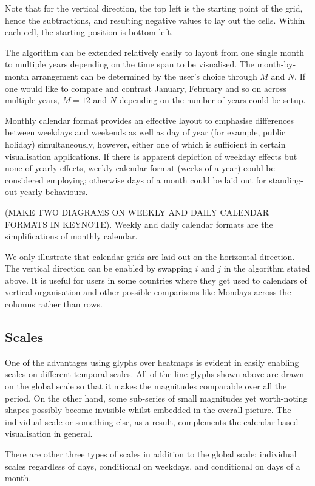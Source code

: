 \documentclass[article]{jss}
\begin{document}
Note that for the vertical direction, the top left is the starting point
of the grid, hence the subtractions, and resulting negative values to
lay out the cells. Within each cell, the starting position is bottom
left.

The algorithm can be extended relatively easily to layout from one
single month to multiple years depending on the time span to be
visualised. The month-by-month arrangement can be determined by the
user's choice through \(M\) and \(N\). If one would like to compare and
contrast January, February and so on across multiple years, \(M = 12\)
and \(N\) depending on the number of years could be setup.

Monthly calendar format provides an effective layout to emphasise
differences between weekdays and weekends as well as day of year (for
example, public holiday) simultaneously, however, either one of which is
sufficient in certain visualisation applications. If there is apparent
depiction of weekday effects but none of yearly effects, weekly calendar
format (weeks of a year) could be considered employing; otherwise days
of a month could be laid out for standing-out yearly behaviours.

(MAKE TWO DIAGRAMS ON WEEKLY AND DAILY CALENDAR FORMATS IN KEYNOTE).
Weekly and daily calendar formats are the simplifications of monthly
calendar.

We only illustrate that calendar grids are laid out on the horizontal
direction. The vertical direction can be enabled by swapping \(i\) and
\(j\) in the algorithm stated above. It is useful for users in some
countries where they get used to calendars of vertical organisation and
other possible comparisons like Mondays across the columns rather than
rows.

\subsection{Scales}\label{scales}

One of the advantages using glyphs over heatmaps is evident in easily
enabling scales on different temporal scales. All of the line glyphs
shown above are drawn on the global scale so that it makes the
magnitudes comparable over all the period. On the other hand, some
sub-series of small magnitudes yet worth-noting shapes possibly become
invisible whilst embedded in the overall picture. The individual scale
or something else, as a result, complements the calendar-based
visualisation in general.

There are other three types of scales in addition to the global scale:
individual scales regardless of days, conditional on weekdays, and
conditional on days of a month.
\end{document}
